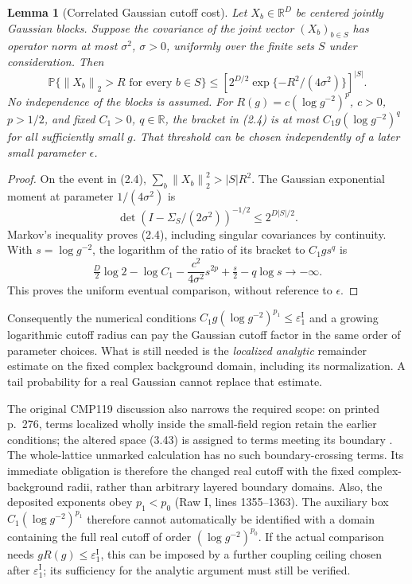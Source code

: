 \documentclass[11pt]{article}
\newtheorem{lemma}[proposition]{Lemma}
\theoremstyle{remark}
\newcommand{\norm}[1]{\left\|#1\right\|}
\begin{document}
\begin{lemma}[Correlated Gaussian cutoff cost]
Let $X_b\in\mathbb R^D$ be centered jointly Gaussian blocks. Suppose
the covariance of the joint vector $(X_b)_{b\in S}$ has operator norm
at most $\sigma^2$, $\sigma>0$, uniformly over the finite sets $S$ under consideration.
Then
\[
 \mathbb P\{\norm{X_b}_2>R\text{ for every }b\in S\}
 \le \left[2^{D/2}\exp\{-R^2/(4\sigma^2)\}\right]^{|S|}.
 \tag{2.4}
\]
No independence of the blocks is assumed. For
$R(g)=c(\log g^{-2})^p$, $c>0$, $p>1/2$, and fixed $C_1>0$, $q\in\mathbb R$,
the bracket in (2.4) is at most
$C_1g(\log g^{-2})^q$ for all sufficiently small $g$.
That threshold can be chosen independently of a later small parameter
$\epsilon$.
\end{lemma}
\begin{proof}
On the event in (2.4), $\sum_b\norm{X_b}_2^2>|S|R^2$.
The Gaussian exponential moment at parameter $1/(4\sigma^2)$ is
\[
 \det(I-\Sigma_S/(2\sigma^2))^{-1/2}\le2^{D|S|/2}.
\]
Markov's inequality proves (2.4), including singular covariances by
continuity. With $s=\log g^{-2}$, the logarithm of the ratio of its
bracket to $C_1g s^q$ is
\[
 \tfrac D2\log2-\log C_1-\frac{c^2}{4\sigma^2}s^{2p}
       +\tfrac s2-q\log s\longrightarrow-\infty.
\]
This proves the uniform eventual comparison, without reference to
$\epsilon$.
\end{proof}

Consequently the numerical conditions
$C_1g(\log g^{-2})^{p_1}\le\varepsilon_1^{\mathrm I}$ and a growing
logarithmic cutoff radius can pay the Gaussian cutoff factor in the
same order of parameter choices. What is still needed is the
\emph{localized analytic} remainder estimate on the fixed complex
background domain, including its normalization. A tail probability
for a real Gaussian cannot replace that estimate.

The original CMP119 discussion also narrows the required scope:
on printed p.\ 276, terms localized wholly inside the small-field
region retain the earlier conditions; the altered space (3.43) is
assigned to terms meeting its boundary \cite{balaban119}. The
whole-lattice unmarked calculation has no such boundary-crossing terms.
Its immediate obligation is therefore the changed real cutoff with
the fixed complex-background radii, rather than arbitrary layered
boundary domains.
Also, the deposited exponents obey $p_1<p_0$ (Raw I, lines
1355--1363). The auxiliary box $C_1(\log g^{-2})^{p_1}$ therefore
cannot automatically be identified with a domain containing the full
real cutoff of order $(\log g^{-2})^{p_0}$. If the actual comparison
needs $gR(g)\le\varepsilon_1^{\mathrm I}$, this can be imposed by a
further coupling ceiling chosen after $\varepsilon_1^{\mathrm I}$;
its sufficiency for the analytic argument must still be verified.
\end{document}
